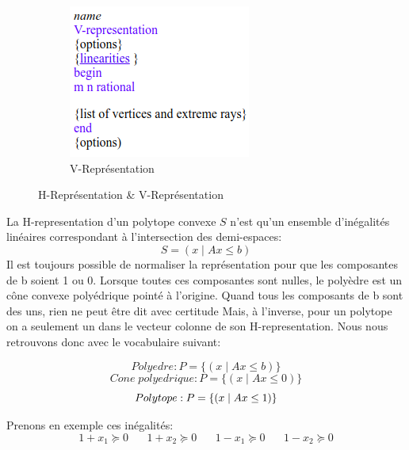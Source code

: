 \begin{figure}[ht]
\begin{subfigure}{.33\textwidth}
		\includegraphics[width=\textwidth,scale=0.7]{images/V_representation.png}
		\caption{V-Représentation}
		\label{fig:v_represt}
	\end{subfigure}\hfill%
	\caption{H-Représentation \& V-Représentation}
	\end{figure}
    
    
    
    
    \vspace*{.5cm}
    
La H-representation d'un polytope convexe $S$ n'est qu'un ensemble d'inégalités linéaires correspondant à l'intersection des demi-espaces: $$S = (x \; |\; Ax\leq b)$$
 Il est toujours possible de normaliser la représentation pour que les composantes de b soient 1 ou 0. Lorsque toutes ces composantes sont nulles, le polyèdre est un cône convexe polyédrique pointé à l'origine. Quand tous les composants de b sont des uns, rien ne peut être dit avec certitude Mais, à l'inverse, pour un polytope on a seulement un dans le vecteur colonne de son H-representation. Nous nous retrouvons donc avec le vocabulaire suivant:
 
 $$Polyedre: P=\{(x \; | \; Ax\leq b)\} $$
 $$Cone \; polyedrique: P=\{(x \; | \; Ax\leq 0)\}$$
$$Polytope: P=\{(x \; | \; Ax\leq 1)\}\\ $$

Prenons en exemple ces inégalités:
 \begin{equation}
      1+{x}_{1} \succeq 0 \;\;\; \;\;\;  1+{x}_{2}\succeq 0  \;\;\;\; \; \; 1-{x}_{1} \succeq 0 \;\; \;\; \;\;   1-{x}_{2} \succeq 0 
\end{equation}

